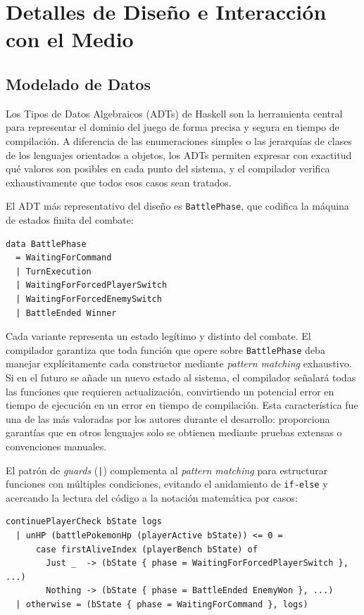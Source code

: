 \section{Detalles de Diseño e Interacción con el Medio}

\subsection{Modelado de Datos}

Los Tipos de Datos Algebraicos (ADTs) de Haskell son la herramienta central para representar el dominio del juego de forma precisa y segura en tiempo de compilación. A diferencia de las enumeraciones simples o las jerarquías de clases de los lenguajes orientados a objetos, los ADTs permiten expresar con exactitud qué valores son posibles en cada punto del sistema, y el compilador verifica exhaustivamente que todos esos casos sean tratados.

El ADT más representativo del diseño es \texttt{BattlePhase}, que codifica la máquina de estados finita del combate:

\begin{verbatim}
data BattlePhase
  = WaitingForCommand
  | TurnExecution
  | WaitingForForcedPlayerSwitch
  | WaitingForForcedEnemySwitch
  | BattleEnded Winner
\end{verbatim}

Cada variante representa un estado legítimo y distinto del combate. El compilador garantiza que toda función que opere sobre \texttt{BattlePhase} deba manejar explícitamente cada constructor mediante \textit{pattern matching} exhaustivo. Si en el futuro se añade un nuevo estado al sistema, el compilador señalará todas las funciones que requieren actualización, convirtiendo un potencial error en tiempo de ejecución en un error en tiempo de compilación. Esta característica fue una de las más valoradas por los autores durante el desarrollo: proporciona garantías que en otros lenguajes solo se obtienen mediante pruebas extensas o convenciones manuales.

\medskip

El patrón de \textit{guards} (\texttt{|}) complementa al \textit{pattern matching} para estructurar funciones con múltiples condiciones, evitando el anidamiento de \texttt{if-else} y acercando la lectura del código a la notación matemática por casos:

\begin{verbatim}
continuePlayerCheck bState logs
  | unHP (battlePokemonHp (playerActive bState)) <= 0 =
      case firstAliveIndex (playerBench bState) of
        Just _  -> (bState { phase = WaitingForForcedPlayerSwitch }, ...)
        Nothing -> (bState { phase = BattleEnded EnemyWon }, ...)
  | otherwise = (bState { phase = WaitingForCommand }, logs)
\end{verbatim}

